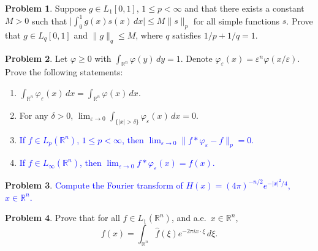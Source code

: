 \documentclass[12pt,reqno]{amsart}
\def\field#1{\mathbb{#1}}
\def\abs#1{\lvert {#1} \rvert}
\def\Lpnorm#1#2{\lVert {#1} \rVert_{#2}}
\theoremstyle{definition}
\newtheorem{problem}{Problem}
\theoremstyle{remark}
\begin{document}
\begin{problem}
  Suppose $g \in L_1[0,1]$, $1 \leq p < \infty$ and that there exists
  a constant $M>0$ such that $\big\lvert \int_0^1 g(x)s(x)\, dx
  \big\rvert \leq M \Lpnorm{s}{p}$ for all simple functions $s$.
  Prove that $g \in L_q[0,1]$ and $\Lpnorm{g}{q} \leq M$, where $q$
  satisfies $1/p + 1/q = 1$.
\end{problem}
\begin{problem}
  Let $\varphi \geq 0$ with $\int_{\field{R}^n} \varphi(y)\, dy =1$.
  Denote $\varphi_\varepsilon (x) = \varepsilon^n
  \varphi(x/\varepsilon)$. Prove the following statements:
  \begin{enumerate}
  \item $\displaystyle{\int_{\field{R}^n} \varphi_\varepsilon (x)\, dx
      = \int_{\field{R}^n} \varphi(x)\, dx}$.
  \item For any $\delta >0$, $\displaystyle{\lim_{\varepsilon \to 0}
      \int_{\{ \abs{x}> \delta \}} \varphi_\varepsilon (x)\, dx = 0}$.
  \item \textcolor{blue}{If $f \in L_p(\field{R}^n)$, $1 \leq p <
      \infty$, then $\lim_{\varepsilon \to 0} \Lpnorm{f \ast
        \varphi_\varepsilon - f}{p} = 0$.}
  \item \textcolor{blue}{If $f \in L_\infty(\field{R}^n)$, then
      $\lim_{\varepsilon \to 0} f \ast \varphi_\varepsilon (x) =
      f(x)$.}
  \end{enumerate}
\end{problem}
\begin{problem}
  \textcolor{blue}{Compute the Fourier transform of $H(x) =
    (4\pi)^{-n/2} e^{-\abs{x}^2/4}$, $x \in \field{R}^n$.}
\end{problem}
\begin{problem}
  Prove that for all $f \in L_1(\field{R}^n)$, and a.e.~$x \in
  \field{R}^n$,
  \begin{equation*}
    f(x) = \int_{\field{R}^n} \widehat{f}(\xi) e^{-2\pi i x \cdot
    \xi}\, d\xi.
  \end{equation*}
\end{problem}
\end{document}
